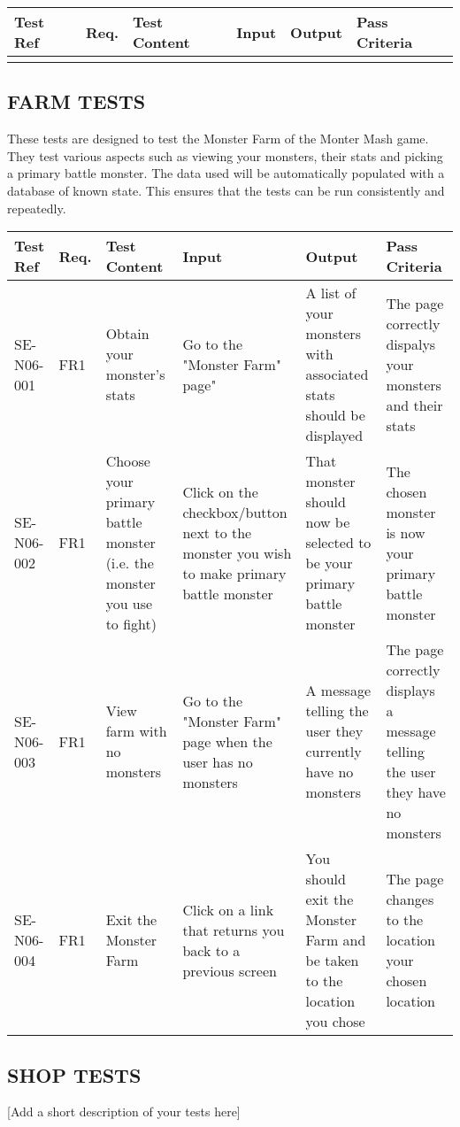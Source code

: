 \documentclass{project}
\begin{document}
\begin{tabular}{| p{2cm} | p{1cm} | p{2cm} | p{3cm} | p{3cm} | p{3cm} |}
\hline
Test Ref & Req. & Test Content & Input & Output & Pass Criteria \\
\hline
 &  &  &  &  &  \\
\hline
\end{tabular}

\subsection*{FARM TESTS}
These tests are designed to test the Monster Farm of the Monter Mash game. They test various aspects such as viewing your monsters, their stats and picking a primary battle monster. The data used will be automatically populated with a database of known state. This ensures that the tests can be run consistently and repeatedly.

\begin{tabular}{| p{2cm} | p{1cm} | p{2cm} | p{3cm} | p{3cm} | p{3cm} |}
\hline
Test Ref & Req. & Test Content & Input & Output & Pass Criteria \\
\hline
SE-N06-001 & FR1 & Obtain your monster's stats & Go to the "Monster Farm" page" & A list of your monsters with associated stats should be displayed & The page correctly dispalys your monsters and their stats \\
\hline
SE-N06-002 & FR1 & Choose your primary battle monster (i.e. the monster you use to fight) & Click on the checkbox/button next to the monster you wish to make primary battle monster & That monster should now be selected to be your primary battle monster& The chosen monster is now your primary battle monster \\
\hline
SE-N06-003 & FR1 & View farm with no monsters & Go to the "Monster Farm" page when the user has no monsters & A message telling the user they currently have no monsters & The page correctly displays a message telling the user they have no monsters \\
\hline
SE-N06-004 & FR1 & Exit the Monster Farm & Click on a link that returns you back to a previous screen & You should exit the Monster Farm and be taken to the location you chose & The page changes to the location your chosen location \\
\hline
\end{tabular}

\subsection*{SHOP TESTS}
[Add a short description of your tests here]
\end{document}
